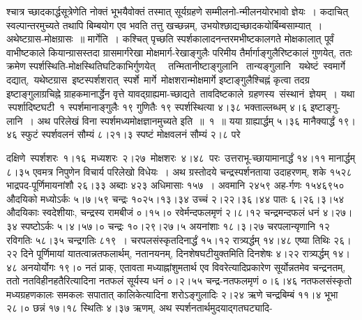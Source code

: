 \documentclass[11pt, openany]{book}
\begin{document}
\noindent श्चात्र च्छादकार्द्धसूत्रेणेति नोक्तं भूभयैवोक्तं तस्मात् सूर्यग्रहणे सम्मीलनो-न्मीलनयोरभावो ज्ञेयः~। कदाचित् स्वल्पान्तरमुच्यते तथापि बिम्बयोग एव भवति \;तत्तु \;खच्छन्नम्, \;उभयोश्छाद्यच्छादकयोर्बिम्बसाम्यात्~। अथेष्टग्रास-मोक्षग्रासः~॥ मार्गेति~। कश्चित् पृच्छति स्पर्शकालादनन्तरमभीष्टकालगते मोक्षकालात् \;पूर्वं \;वाभीष्टकाले \;कियान्ग्रासस्तदा \;ग्रासमार्गरेखा \;मोक्षमार्ग-रेखाङ्गुलैः परिमीय तैर्मार्गाङ्गुलैरिष्टकालं गुणयेत्, ततः क्रमेण स्पर्शस्थिति-मोक्षस्थितिघटिकाभिर्गुणयेत् ~~तन्मितानीष्टाङ्गुलानि ~तान्यङ्गुलानि ~यथेष्टं \,स्वमार्गे \,दद्यात्, \,यथेष्टग्रास \,इष्टस्पर्शशरात् \,स्पर्शे \,मार्गे \,मोक्षशरान्मोक्षमार्गे इष्टाङ्गुलैश्चिह्नं कृत्वा तदग्र इष्टाङ्गुलाग्रचिह्ने ग्राहकमानार्द्धेन वृत्ते यावद्ग्राह्यमा-च्छाद्यते \,तावदिष्टकाले \,ग्रहणस्य \,संस्थानं \,ज्ञेयम्~। यथा \,स्पर्शादिष्टघटी \,१ स्पर्शमानाङ्गुलैः १९ गुणितैः १९ स्पर्शस्थित्या ४।३८ भक्ताल्लब्धम् ४।६ इष्टाङ्गु-लानि~। अथ \;परिलेखं \;विना \;स्पर्शमध्यमोक्षज्ञानमुच्यते\textendash {} इति~॥~१~॥ यया ग्राह्यार्द्धम् ५।३६ मानैक्यार्द्धं १९।४६ स्फुटं स्पर्शवलनं सौम्यं ८।२१।३ स्पष्टं मोक्षवलनं सौम्यं २।८ परे

\newpage

\noindent दक्षिणे \,स्पर्शशरः \,१।१६ \,मध्यशरः \,२।२७ \,मोक्षशरः \,४।४८ \,परः \,उत्तराभू-च्छायामानार्द्धं १४।११ मानार्द्धम् ८।३५ एवमत्र निपुणेन विचार्य परिलेखो विधेयः~। अथ ग्रस्तोदये चन्द्रस्पर्शनताया उदाहरणम्, शके १५२८ भाद्रपद-पूर्णिमायनांशौ २६।३३ अब्दाः ४२३ अधिमासाः १५७~। अवमानि २४५९ अह-र्गणः १५४६९५० औदयिको मध्योऽर्कः ५।७।५९ चन्द्रः १०२५।१३।३४ उच्चं २।२२।३६।४४ पातः ६।२६।३।५४ औदयिकाः स्वदेशीयाः, चन्द्रस्य रामबीजं ०।१५।० रवेर्मन्दफलमृणं २।८।१२ चन्द्रमन्दफलं धनं ४।२७।३४ स्पष्टोऽर्कः ५।४।५७।० चन्द्रः १०।२९।२७।५ अयनांशाः १८।३।२७ चरपलान्यृणानि १२ रविगतिः ५८।३५ चन्द्रगतिः ८१९~। चरपलसंस्कृतदिनार्द्धं १५।१२ रात्र्यर्द्धम् १४।४८ एष्या तिथिः २६।२२ दिने पूर्णिमायां यातत्वान्नतफलार्थम्, नतानयनम्, दिनशेषघटीयुक्तमिति दिनशेषः ४।२२ रात्र्यर्द्धम् १४।४८ अनयोर्योगः १९।० नतं प्राक्, एतावता मध्याह्नांशुमतार्थ एव विवरेत्यादिप्रकारेण सूर्योन्नतमेव चन्द्रनतम्, ततो नतविहीनहतैरित्यादिना नतफलं सूर्यस्य धनं ०।२।५५ चन्द्र-नतफलमृणं ०।६।४६ नतफलसंस्कृतो मध्यग्रहणकालः समकलः सपातात् कालिकेत्यादिना शरोऽङ्गुलादिः २।२४ ऋणे चन्द्रबिम्बं ११।४ भूभा २८।० छन्नं १७।१८ स्थितिः ४।३७ ऋणम्, अथ स्पर्शनतार्थमुदयाद्गतघट्यादि-

\newpage
\end{document}
